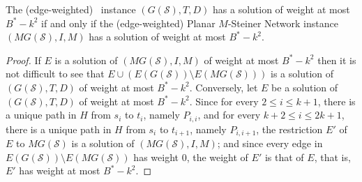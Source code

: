 \begin{lemma}
The (edge-weighted) \biclique\ instance $(G(\mathcal{S}),T,D)$ has a solution of weight at most $B^*-k^2$ if and only if the (edge-weighted) {\sc Planar $M$-Steiner Network} instance $(MG(\mathcal{S}),I,M)$ has a solution of weight at most $B^*-k^2$.
\end{lemma}

\begin{proof}
If $E$ is a solution of $(MG(\mathcal{S}),I,M)$ of weight at most $B^*-k^2$ then it is not difficult to see that $E \cup (E(G(\mathcal{S})) \setminus E(MG(\mathcal{S})))$ is a solution of $(G(\mathcal{S}),T,D)$ of weight at most $B^*-k^2$. Conversely, let $E$ be a solution of $(G(\mathcal{S}),T,D)$ of weight at most $B^*-k^2$. Since for every $2 \leq i \leq k+1$, there is a unique path in $H$ from $s_i$ to $t_i$, namely $P_{i,i}$, and for every $k+2 \leq i \leq 2k+1$, there is a unique path in $H$ from $s_i$ to $t_{i+1}$, namely $P_{i,i+1}$, the restriction $E'$ of $E$ to $MG(\mathcal{S})$ is a solution of $(MG(\mathcal{S}),I,M)$; and since every edge in $E(G(\mathcal{S})) \setminus E(MG(\mathcal{S}))$ has weight 0, the weight of $E'$ is that of $E$, that is, $E'$ has weight at most $B^*-k^2$.
\end{proof}